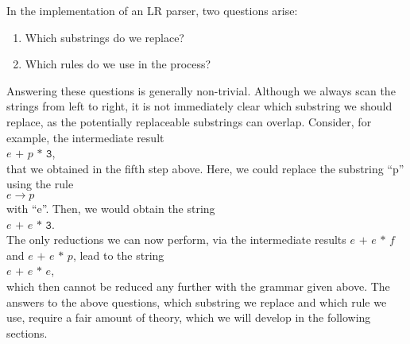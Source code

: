 \noindent
In the implementation of an LR parser, two questions arise:
\begin{enumerate}
\item Which substrings do we replace?
\item Which rules do we use in the process?
\end{enumerate}
Answering these questions is generally non-trivial. Although we always scan the strings from left to right, it is not immediately clear which substring we should replace, as the potentially replaceable substrings can overlap. Consider, for example, the intermediate result
\\[0.2cm]
\hspace*{1.3cm}
\(e \texttt{ + } p \texttt{ * 3}\),
\\[0.2cm]
that we obtained in the fifth step above.
Here, we could replace the substring ``p'' using the rule
\\[0.2cm]
\hspace*{1.3cm}
\(e \rightarrow p\)
\\[0.2cm]
with ``e''. Then, we would obtain the string
\\[0.2cm]
\hspace*{1.3cm}
\(e \texttt{ + } e \texttt{ * 3}\).
\\[0.2cm]
The only reductions we can now perform, via the intermediate results \(e \texttt{ + } e \texttt{ * } f\) and
\(e \texttt{ + } e \texttt{ * } p\), lead to the string 
\\[0.2cm]
\hspace*{1.3cm}
\(e \texttt{ + } e \texttt{ * } e\),
\\[0.2cm]
which then cannot be reduced any further with the grammar given above. The answers to the above questions,
which substring we replace and which rule we use, require a fair amount of theory, which we will develop in the
following sections. 

